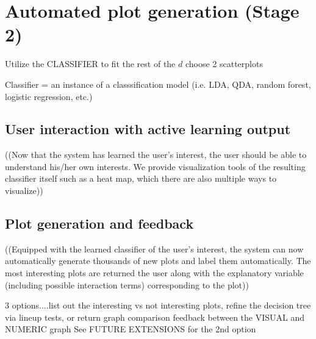 \section{Automated plot generation (Stage 2)}
\label{sec:visualizer:plotgeneration}

Utilize the CLASSIFIER to fit the rest of the $d$ choose 2 scatterplots

Classifier = an instance of a classsification model
(i.e. LDA, QDA, random forest, logistic 
regression, etc.) 

\subsection{User interaction with active learning output}
\label{sec:visualizer:plotgeneration:user}

((Now that the system has learned the user’s interest, the user should be able
to understand his/her own interests. We provide visualization tools of the
resulting classifier itself such as a heat map, which there are also multiple
ways to visualize))

\subsection{Plot generation and feedback}
\label{sec:visualizer:plotgeneration:feedback}

((Equipped with the learned classifier of the user’s interest, the system can
now automatically generate thousands of new plots and label them automatically.
The most interesting plots are returned the user along with the explanatory
variable (including possible interaction terms) corresponding to the plot))

3 options....list out the interesting vs not interesting plots, refine the
decision tree via lineup tests, or return graph comparison feedback between the
VISUAL and NUMERIC graph
See FUTURE EXTENSIONS for the 2nd option
